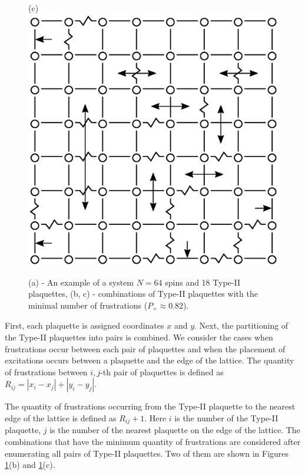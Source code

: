 \documentclass[preprint,12pt]{elsarticle}
\begin{document}
\begin{figure}[H]
\begin{minipage}[h]{0.3\linewidth}
		\end{minipage}
		\hspace{10pt}
		\begin{minipage}[h]{0.3\linewidth}
			\centering(c)
			\includegraphics[width=1\linewidth]{pictures/2PS_cell64_J72_5.eps}
		\end{minipage}
		\caption{(a) - An example of a system $N=64$ spins and 18 Type-II plaquettes, (b, c) - combinations of Type-II plaquettes with the minimal number of frustrations ($P_+\approx0.82$).}
		\label{fig:12PS_cell64_J72_5}
	\end{figure}
	
	
	First, each plaquette is assigned coordinates $x$ and $y$. Next, the partitioning of the Type-II plaquettes into pairs is combined. We consider the cases when frustrations occur between each pair of plaquettes and when the placement of excitations occurs between a plaquette and the edge of the lattice. The quantity of frustrations between $i,j$-th pair of plaquettes is defined as $R_{ij} = \left|x_i-x_j\right|+\left|y_i-y_j\right|$.
	
	The quantity of frustrations occurring from the Type-II plaquette to the nearest edge of the lattice is defined as $R_{ij}+1$. Here $i$ is the number of the Type-II plaquette, $j$ is the number of the nearest plaquette on the edge of the lattice. The combinations that have the minimum quantity of frustrations are considered after enumerating all pairs of Type-II plaquettes. Two of them are shown in Figures \ref{fig:12PS_cell64_J72_5}(b) and \ref{fig:12PS_cell64_J72_5}(c).
	
\end{document}
